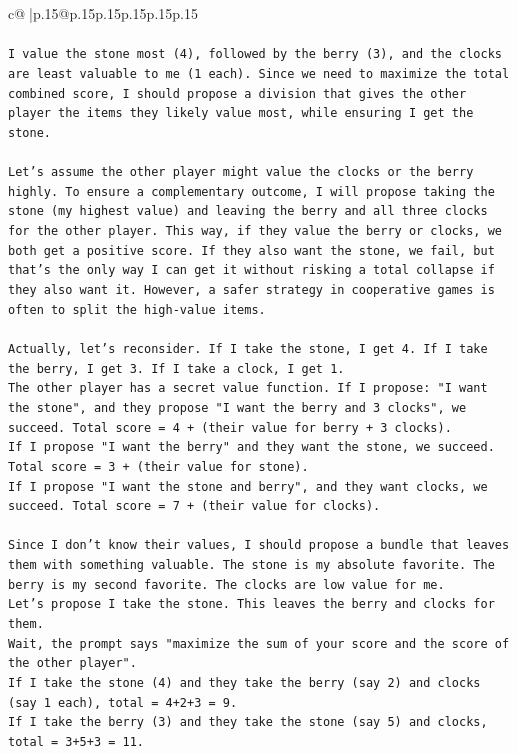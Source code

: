\documentclass{article}
\begin{document}
{\begin{supertabular}{c@{$\;$}|p{.15\linewidth}@{}p{.15\linewidth}p{.15\linewidth}p{.15\linewidth}p{.15\linewidth}p{.15\linewidth}}
{{{\\ 
\\ 
\texttt{I value the stone most (4), followed by the berry (3), and the clocks are least valuable to me (1 each). Since we need to maximize the total combined score, I should propose a division that gives the other player the items they likely value most, while ensuring I get the stone.} \\
\\ 
\texttt{Let's assume the other player might value the clocks or the berry highly. To ensure a complementary outcome, I will propose taking the stone (my highest value) and leaving the berry and all three clocks for the other player. This way, if they value the berry or clocks, we both get a positive score. If they also want the stone, we fail, but that's the only way I can get it without risking a total collapse if they also want it. However, a safer strategy in cooperative games is often to split the high{-}value items.} \\
\\ 
\texttt{Actually, let's reconsider. If I take the stone, I get 4. If I take the berry, I get 3. If I take a clock, I get 1.} \\
\texttt{The other player has a secret value function. If I propose: "I want the stone", and they propose "I want the berry and 3 clocks", we succeed. Total score = 4 + (their value for berry + 3 clocks).} \\
\texttt{If I propose "I want the berry" and they want the stone, we succeed. Total score = 3 + (their value for stone).} \\
\texttt{If I propose "I want the stone and berry", and they want clocks, we succeed. Total score = 7 + (their value for clocks).} \\
\\ 
\texttt{Since I don't know their values, I should propose a bundle that leaves them with something valuable. The stone is my absolute favorite. The berry is my second favorite. The clocks are low value for me.} \\
\texttt{Let's propose I take the stone. This leaves the berry and clocks for them.} \\
\texttt{Wait, the prompt says "maximize the sum of your score and the score of the other player".} \\
\texttt{If I take the stone (4) and they take the berry (say 2) and clocks (say 1 each), total = 4+2+3 = 9.} \\
\texttt{If I take the berry (3) and they take the stone (say 5) and clocks, total = 3+5+3 = 11.} \\
}}}
\end{supertabular}}
\end{document}
